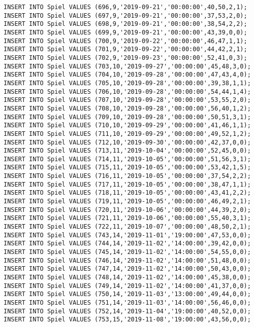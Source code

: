 \documentclass{lehramt-informatik-aufgabe}
\begin{document}
\begin{verbatim}
INSERT INTO Spiel VALUES (696,9,'2019-09-21','00:00:00',40,50,2,1);
INSERT INTO Spiel VALUES (697,9,'2019-09-21','00:00:00',37,53,2,0);
INSERT INTO Spiel VALUES (698,9,'2019-09-21','00:00:00',38,54,2,2);
INSERT INTO Spiel VALUES (699,9,'2019-09-21','00:00:00',43,39,0,0);
INSERT INTO Spiel VALUES (700,9,'2019-09-22','00:00:00',46,47,1,1);
INSERT INTO Spiel VALUES (701,9,'2019-09-22','00:00:00',44,42,2,1);
INSERT INTO Spiel VALUES (702,9,'2019-09-23','00:00:00',52,41,0,3);
INSERT INTO Spiel VALUES (703,10,'2019-09-27','00:00:00',45,48,3,0);
INSERT INTO Spiel VALUES (704,10,'2019-09-28','00:00:00',47,43,4,0);
INSERT INTO Spiel VALUES (705,10,'2019-09-28','00:00:00',39,38,1,1);
INSERT INTO Spiel VALUES (706,10,'2019-09-28','00:00:00',54,44,1,4);
INSERT INTO Spiel VALUES (707,10,'2019-09-28','00:00:00',53,55,2,0);
INSERT INTO Spiel VALUES (708,10,'2019-09-28','00:00:00',56,40,1,2);
INSERT INTO Spiel VALUES (709,10,'2019-09-28','00:00:00',50,51,3,1);
INSERT INTO Spiel VALUES (710,10,'2019-09-29','00:00:00',41,46,1,1);
INSERT INTO Spiel VALUES (711,10,'2019-09-29','00:00:00',49,52,1,2);
INSERT INTO Spiel VALUES (712,10,'2019-09-30','00:00:00',42,37,0,0);
INSERT INTO Spiel VALUES (713,11,'2019-10-04','00:00:00',52,45,0,0);
INSERT INTO Spiel VALUES (714,11,'2019-10-05','00:00:00',51,56,3,1);
INSERT INTO Spiel VALUES (715,11,'2019-10-05','00:00:00',53,42,1,5);
INSERT INTO Spiel VALUES (716,11,'2019-10-05','00:00:00',37,54,2,2);
INSERT INTO Spiel VALUES (717,11,'2019-10-05','00:00:00',38,47,1,1);
INSERT INTO Spiel VALUES (718,11,'2019-10-05','00:00:00',43,41,2,2);
INSERT INTO Spiel VALUES (719,11,'2019-10-05','00:00:00',46,49,2,1);
INSERT INTO Spiel VALUES (720,11,'2019-10-06','00:00:00',44,39,2,0);
INSERT INTO Spiel VALUES (721,11,'2019-10-06','00:00:00',55,40,3,1);
INSERT INTO Spiel VALUES (722,11,'2019-10-07','00:00:00',48,50,2,1);
INSERT INTO Spiel VALUES (743,14,'2019-11-01','19:00:00',47,53,0,0);
INSERT INTO Spiel VALUES (744,14,'2019-11-02','14:00:00',39,42,0,0);
INSERT INTO Spiel VALUES (745,14,'2019-11-02','14:00:00',54,55,0,0);
INSERT INTO Spiel VALUES (746,14,'2019-11-02','14:00:00',51,48,0,0);
INSERT INTO Spiel VALUES (747,14,'2019-11-02','14:00:00',50,43,0,0);
INSERT INTO Spiel VALUES (748,14,'2019-11-02','14:00:00',45,38,0,0);
INSERT INTO Spiel VALUES (749,14,'2019-11-02','14:00:00',41,37,0,0);
INSERT INTO Spiel VALUES (750,14,'2019-11-03','13:00:00',49,44,0,0);
INSERT INTO Spiel VALUES (751,14,'2019-11-03','14:00:00',56,46,0,0);
INSERT INTO Spiel VALUES (752,14,'2019-11-04','19:00:00',40,52,0,0);
INSERT INTO Spiel VALUES (753,15,'2019-11-08','19:00:00',43,56,0,0);

\end{verbatim}
\end{document}
